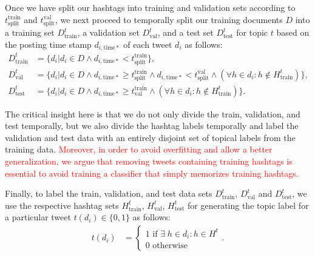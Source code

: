 Once we have split our hashtags into training and validation sets
according to $t^\mathrm{train}_\mathrm{split}$ and $t^\mathrm{val}_\mathrm{split}$, we next proceed to temporally split
our training documents $D$ into a training set $D^t_\mathrm{train}$, a validation set
$D^t_\mathrm{val}$, and a test set $D^t_\mathrm{test}$ for topic $t$ based on the posting
time stamp $d_{i,\mathrm{time*}}$ of each tweet $d_i$ as follows: 
\begin{align*}
D^t_\mathrm{train} & = \{ d_i | d_i \in D \land d_{i,\mathrm{time*}} <    t^\mathrm{train}_\mathrm{split} \} ,  \\
D^t_\mathrm{val}   & = \{ d_i | d_i \in D \land d_{i,\mathrm{time*}} \geq t^\mathrm{train}_\mathrm{split} \land  d_{i,\mathrm{time*}} <    t^\mathrm{val}_\mathrm{split} \land (\forall h \in d_i: h \notin H^t_\mathrm{train}) \} ,  \\
D^t_\mathrm{test}   & = \{ d_i | d_i \in D \land d_{i,\mathrm{time*}} \geq t^\mathrm{train}_\mathrm{val} \land (\forall h \in d_i: h \notin H^t_\mathrm{train}) \} .
\end{align*}


The critical insight here is that we do not only divide the train, validation, and test
temporally, but we also divide the hashtag labels temporally and label the validation and test
data with an entirely disjoint set of topical labels from the training data. \textcolor{red}{Moreover, in order to avoid overfitting and allow a better generalization, we argue that removing tweets containing training hashtags is essential to avoid training a classifier that simply memorizes training hashtags.}
 



Finally, to label the train, validation, and test data sets $D^t_\mathrm{train}$, $D^t_\mathrm{val}$ and $D^t_\mathrm{test}$, 
we use the respective
hashtag sets $H^t_\mathrm{train}$, $H^t_\mathrm{val}$, $H^t_\mathrm{test}$ for generating
the topic label for a particular tweet $t(d_{i}) \in \{0,1\}$ as follows:
\begin{align*}
t(d_{i}) & =
  \begin{cases}
    1 \textrm{ if }  \exists \; h \in d_i:  h  \in H^t  \\
    0  \textrm{ otherwise}
  \end{cases} .
\end{align*}

